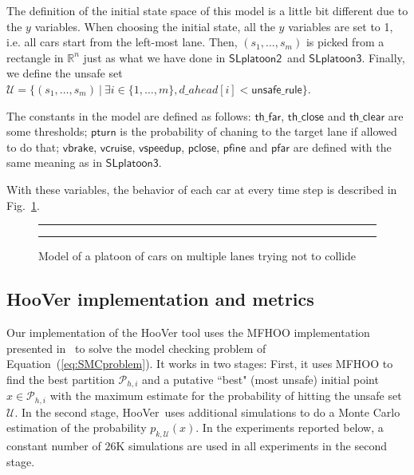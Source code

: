 \documentclass[11pt]{article}
\theoremstyle{definition}
\newcommand{\sayan}[1]{\textcolor{blue}{#1}}
\newcommand{\phit}[3]{{p_{#1,#2}{(#3)}}}
\newcommand{\Unsafe}{\mathcal{U}}
\newcommand{\partition}[2]{{\mathcal{P}_{#1,#2}}}
\newcommand{\SlplatoonTwo}{{$\mathsf{SLplatoon2}$\xspace}}
\newcommand{\SlplatoonThree}{{$\mathsf{SLplatoon3}$\xspace}}
\newcommand{\toolname}{{{\sf HooVer}\xspace}}
\newcommand{\two}[4]{
  \parbox{.95\columnwidth}{\vspace{1pt} \vfill
    \parbox[t]{#1\columnwidth}{#3}%
    \parbox[t]{#2\columnwidth}{#4}%
  }}
\begin{document}
The definition of the initial state space of this model is a little bit different due to the $y$ variables. When choosing the initial state, all the $y$ variables are set to 1, i.e. all cars start from the left-most lane. Then, $(s_1, \ldots, s_m)$ is picked from a rectangle in $\mathbb{R}^n$ just as what we have done in \SlplatoonTwo\ and \SlplatoonThree. Finally, we define the unsafe set $\Unsafe = \{(s_1, \ldots, s_m)\ |\ \exists i \in \{1, \ldots, m\}, \mathit{d\_ahead}[i] < \mathsf{unsafe\_rule}\}$.

The constants in the model are defined as follows: $\mathsf{th\_far}$, $\mathsf{th\_close}$ and $\mathsf{th\_clear}$ are some thresholds; $\mathsf{pturn}$ is the probability of chaning to the target lane if allowed to do that; $\mathsf{vbrake}$, $\mathsf{vcruise}$, $\mathsf{vspeedup}$, $\mathsf{pclose}$, $\mathsf{pfine}$ and $\mathsf{pfar}$ are defined with the same meaning as in \SlplatoonThree.

With these variables, the behavior of each car at every time step is described in Fig.~\ref{fig:Mlplatoon}.
%
\begin{figure}
	\centering
	\hrule
	\two{.3}{.70}
	{}
	{}
	\hrule
	\caption{Model of a platoon of cars on multiple lanes trying not to collide}
	\label{fig:Mlplatoon}
\end{figure}

\subsection{\toolname{} implementation and metrics}
\label{sec:eval-mfhoo}

Our implementation of the \toolname{} tool uses the MFHOO implementation presented in~\cite{sen2019noisy} to solve the model checking problem of Equation~(\ref{eq:SMCproblem}). It works in two stages: First, it uses MFHOO to find the best partition $\partition{h}{i}$ and a putative ``best" (most unsafe) initial point $x \in \partition{h}{i}$ with the maximum estimate for the probability of hitting the unsafe set $\Unsafe$. In the second stage, \toolname\ uses additional simulations to do a Monte Carlo estimation of the probability $\phit{k}{\Unsafe}{x}$. In the experiments reported below, a constant number of $26$K simulations are used in all experiments in the second stage.
%
%
\end{document}
